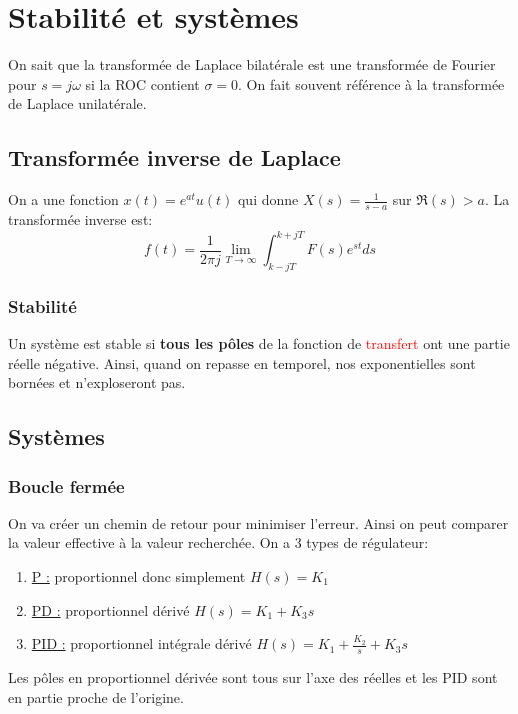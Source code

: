 \documentclass{report}
\begin{document}
\chapter{Stabilité et systèmes}
On sait que la transformée de Laplace bilatérale est une transformée de Fourier pour $s = j \omega$ si la ROC contient $\sigma = 0$. On fait souvent référence à la transformée de Laplace unilatérale.

\section{Transformée inverse de Laplace}
On a une fonction $x(t) = e^{at} u(t)$ qui donne $X(s) = \frac{1}{s-a}$ sur $\mathfrak{R}(s) >a$. La transformée inverse est:
\begin{equation}
f(t) = \frac{1}{2 \pi j} \lim_{T\rightarrow \infty} \int_{k - j T}^{k + j T} F(s) e^{st} ds
\end{equation}

\subsection{Stabilité}
Un système est stable si \textbf{tous les pôles} de la fonction de \textcolor{red}{transfert} ont une partie réelle négative.
Ainsi, quand on repasse en temporel, nos exponentielles sont bornées et n'exploseront pas.

\section{Systèmes}
\subsection{Boucle fermée}
On va créer un chemin de retour pour minimiser l'erreur. Ainsi on peut comparer la valeur effective à la valeur recherchée. On a 3 types de régulateur:
\begin{enumerate}
\item \underline{P :} proportionnel donc simplement $H(s) = K_1$
\item \underline{PD :} proportionnel dérivé $H(s) = K_1 + K_3 s$
\item \underline{PID :} proportionnel intégrale dérivé $H(s) = K_1 + \frac{K_2}{s} + K_3 s$
\end{enumerate}
Les pôles en proportionnel dérivée sont tous sur l'axe des réelles et les PID sont en partie proche de l'origine.
\end{document}
